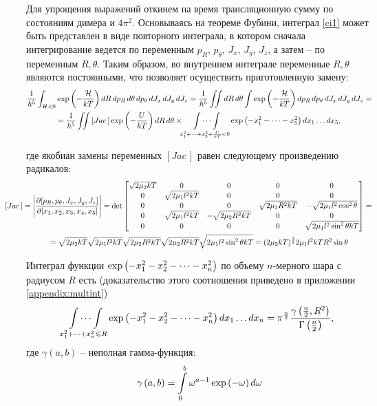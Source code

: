 Для упрощения выражений откинем на время трансляционную сумму по состояниям димера и $4 \pi^2$. Основываясь на теореме Фубини, интеграл \eqref{ci1} может быть представлен в виде повторного интеграла, в котором сначала интегрирование ведется по переменным $p_R$, $p_\theta$, $J_x$, $J_y$, $J_z$, а затем  -- по переменным $R, \theta$. Таким образом, во внутреннем интеграле переменные $R, \theta$ являются постоянными, что позволяет осуществить приготовленную замену:
\vverh
\begin{gather}
	\frac{1}{h^5} \int_{H < 0} \exp \left( -\frac{\mathcal{H}}{kT} \right) dR \, dp_R \, d \theta \, dp_\theta \, d J_x \, d J_y \, d J_z = \frac{1}{h^5} \iint dR \, d \theta \int \exp \left( -\frac{\mathcal{H}}{kT} \right) d p_R \, d p_\theta \, d J_x \, d J_y \, d J_z = \notag \\
	= \frac{1}{h^5} \iint  \left[ Jac \, \right] \exp \left( -\frac{U}{kT} \right) d R \, d \theta \times \idotsint\limits_{x_1^2 + \dots + x_5^2 + \frac{U}{kT} < 0} \exp \left( - x_1^2 - \dots - x_5^2 \right) dx_1 \dots dx_5, \notag 
\end{gather}

\vlevo где якобиан замены переменных $\left[ Jac \, \right]$ равен следующему произведению радикалов: 
\begin{gather}
	\hspace*{-1.0cm}
	\left[ Jac \, \right] = \Bigg{|} \frac{\partial [p_R, p_\theta, J_x, J_y, J_z]}{\partial [x_1, x_2, x_3, x_4, x_5]} \Bigg{|} = \det  
	\begin{bmatrix}
		\sqrt{2 \mu_2 k T} & 0 & 0 & 0 & 0 \\
		0 & \sqrt{2 \mu_1 l^2 k T} & 0 & 0 & 0 \\
		0 & 0 & 0 & \sqrt{2 \mu_2 R^2 k T} & -\sqrt{2 \mu_1 l^2 \cos^2 \theta} \\
		0 & \sqrt{2 \mu_1 l^2 k T} & -\sqrt{2 \mu_2 R^2 k T} & 0 & 0 \\
		0 & 0 & 0 & 0 & \sqrt{2 \mu_1 l^2 \sin^2 \theta k T}
	\end{bmatrix} = \notag \\
	= \sqrt{2 \mu_2 k T} \sqrt{2 \mu_1 l^2 k T} \sqrt{2 \mu_2 R^2 kT} \sqrt{2 \mu_2 R^2 kT} \sqrt{2 \mu_1 l^2 \sin^2 \theta kT} = (2 \mu_2 kT)^\frac{3}{2} 2\mu_1 l^2 k T R^2 \sin \theta \notag
\end{gather}

Интеграл функции $\exp \left( - x_1^2  - x_2^2 - \dots - x_n^2 \right)$ по объему $n$-мерного шара с радиусом $R$ есть (доказательство этого соотношения приведено в приложении \eqref{appendix:multint})
\vverh
\begin{gather}
	\idotsint\limits_{x_1^2 + \dots + x_n^2 \leqslant R} \exp \left( -x_1^2 - x_2^2 - \dots - x_n^2 \right) d x_1 \dots d x_n = \pi^\frac{n}{2} \frac{\gamma \left( \frac{n}{2}, R^2 \right)}{\Gamma \left( \frac{n}{2} \right)}, \notag
\end{gather}
где $\gamma(a, b)$ -- неполная гамма-функция:
\vverh
\begin{gather}
	\gamma \left( a, b \right) = \int\limits_0^b \omega^{a - 1} \exp \left( - \omega \right) d \omega \notag
\end{gather}

